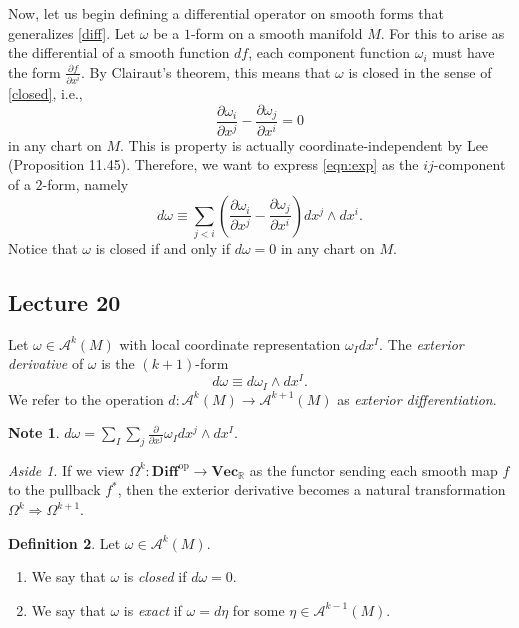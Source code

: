 \documentclass[10pt,letterpaper,cm]{nupset}
\theoremstyle{definition}
\newtheorem{definition}{Definition}[subsection]
\newtheorem{note}[definition]{Note}
\theoremstyle{theorem}
\theoremstyle{remark}
\newtheorem*{aside}{Aside}
\newcommand{\R}{\mathbb R}
\newcommand{\1}{\mathbf{1}}
\newcommand{\0}{\vec 0}
\DeclareMathOperator{\op}{op}
\begin{document}
\bigskip

Now, let us begin defining a differential operator on smooth forms that generalizes \cref{diff}. Let $\omega$ be a $1$-form on a smooth manifold $M$. For this to arise as the differential of a smooth function $d{f}$, each component function $\omega_i$ must have the form $\frac{\partial{f}}{\partial{x^i}}$. By Clairaut's theorem, this means that $\omega$ is closed in the sense of \cref{closed}, i.e.,
\[ \label{eqn:exp}
\frac{\partial{\omega_i}}{\partial{x^j}} - \frac{\partial{\omega_j}}{\partial{x^i}} =0 \tag{$\ast$}
\] in any chart on $M$.
This is property is actually coordinate-independent by Lee (Proposition 11.45). Therefore, we want to express \eqref{eqn:exp} as the $ij$-component of a $2$-form, namely
\[
d{\omega}\equiv \sum_{j<i}\left(\frac{\partial \omega_{i}}{\partial x^{j}}-\frac{\partial \omega_{j}}{\partial x^{i}}\right) d x^{j} \wedge d x^{i}.
\] Notice that $\omega$ is closed if and only if $d{\omega} =0$ in any chart on $M$.

\subsection{Lecture 20}


Let $\omega \in \mathcal{A}^k(M)$ with local coordinate representation $\omega_I dx^I$. The \textit{exterior derivative} of $\omega$ is the $\left(k+1\right)$-form $$d\omega \equiv d \omega_I \wedge dx^I.$$ We refer to the operation $d : \mathcal{A}^k(M) \to \mathcal{A}^{k+1}(M)$ as \textit{exterior differentiation}.


\begin{note}
$d \omega = \sum_I\sum_j\frac{\partial}{\partial{x^j}}\omega_I dx^j \wedge dx^I.$
\end{note}

\begin{aside}
If we view $\Omega^k : \mathbf{Diff}^{\op} \to \mathbf{Vec}_{\R}$ as the functor sending each smooth map $f$ to the pullback $f^{\ast}$, then the exterior derivative becomes a natural transformation $\Omega^k \Rightarrow \Omega^{k+1}$.  
\end{aside}

\begin{definition} Let $\omega \in \mathcal{A}^k(M)$.
\begin{enumerate}
\item We say that $\omega$ is \textit{closed} if $d \omega = 0$.
\item We say that $\omega$ is \textit{exact} if $\omega = d \eta$ for some $\eta \in \mathcal{A}^{k-1}(M)$.
\end{enumerate}
\end{definition}
\end{document}
